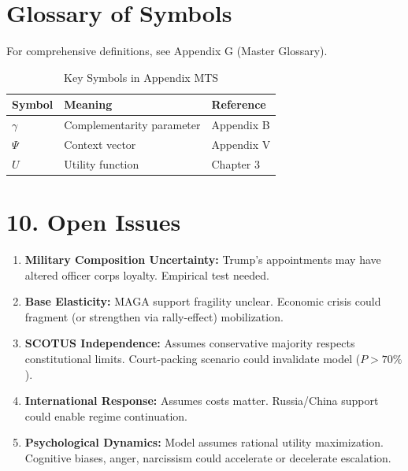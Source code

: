 \section{Glossary of Symbols}
\label{sec:mts-glossary}

For comprehensive definitions, see Appendix G (Master Glossary).

\begin{table}[htbp]
\centering
\caption{Key Symbols in Appendix MTS}
\begin{tabular}{lll}
\toprule
\textbf{Symbol} & \textbf{Meaning} & \textbf{Reference} \\
\midrule
$\gamma$ & Complementarity parameter & Appendix B \\
$\Psi$ & Context vector & Appendix V \\
$U$ & Utility function & Chapter 3 \\
\bottomrule
\end{tabular}
\end{table}


\section{10. Open Issues}

\begin{enumerate}
\item \textbf{Military Composition Uncertainty:} Trump's appointments may have altered officer corps loyalty. Empirical test needed.

\item \textbf{Base Elasticity:} MAGA support fragility unclear. Economic crisis could fragment (or strengthen via rally-effect) mobilization.

\item \textbf{SCOTUS Independence:} Assumes conservative majority respects constitutional limits. Court-packing scenario could invalidate model ($P > 70\%$).

\item \textbf{International Response:} Assumes costs matter. Russia/China support could enable regime continuation.

\item \textbf{Psychological Dynamics:} Model assumes rational utility maximization. Cognitive biases, anger, narcissism could accelerate or decelerate escalation.
\end{enumerate}

